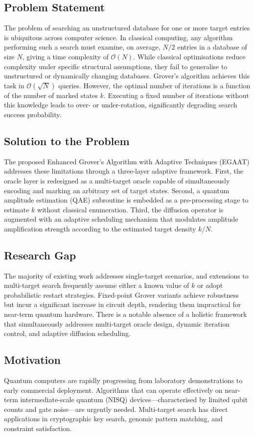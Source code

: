 \documentclass[journal]{IEEEtran}
\begin{document}
\subsection{Problem Statement}
The problem of searching an unstructured database for one or more target entries is ubiquitous across computer science. In classical computing, any algorithm performing such a search must examine, on average, $N/2$ entries in a database of size $N$, giving a time complexity of $\mathcal{O}(N)$. While classical optimisations reduce complexity under specific structural assumptions, they fail to generalise to unstructured or dynamically changing databases. Grover's algorithm achieves this task in $\mathcal{O}(\sqrt{N})$ queries. However, the optimal number of iterations is a function of the number of marked states $k$. Executing a fixed number of iterations without this knowledge leads to over- or under-rotation, significantly degrading search success probability.

\subsection{Solution to the Problem}
The proposed Enhanced Grover's Algorithm with Adaptive Techniques (EGAAT) addresses these limitations through a three-layer adaptive framework. First, the oracle layer is redesigned as a multi-target oracle capable of simultaneously encoding and marking an arbitrary set of target states. Second, a quantum amplitude estimation (QAE) subroutine is embedded as a pre-processing stage to estimate $k$ without classical enumeration. Third, the diffusion operator is augmented with an adaptive scheduling mechanism that modulates amplitude amplification strength according to the estimated target density $k/N$.

\subsection{Research Gap}
The majority of existing work addresses single-target scenarios, and extensions to multi-target search frequently assume either a known value of $k$ or adopt probabilistic restart strategies. Fixed-point Grover variants achieve robustness but incur a significant increase in circuit depth, rendering them impractical for near-term quantum hardware. There is a notable absence of a holistic framework that simultaneously addresses multi-target oracle design, dynamic iteration control, and adaptive diffusion scheduling.

\subsection{Motivation}
Quantum computers are rapidly progressing from laboratory demonstrations to early commercial deployment. Algorithms that can operate effectively on near-term intermediate-scale quantum (NISQ) devices—characterised by limited qubit counts and gate noise—are urgently needed. Multi-target search has direct applications in cryptographic key search, genomic pattern matching, and constraint satisfaction.
\end{document}
